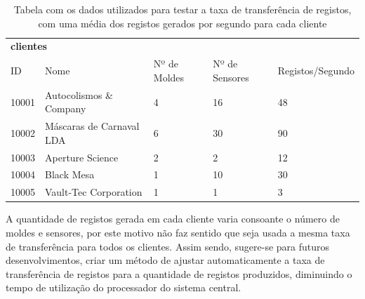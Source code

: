\documentclass[11pt,twoside,a4paper]{report}
\begin{document}
\begin{table}[H]
	\centering
	\begin{tabular}{|l|l|l|l|l|}
		\multicolumn{5}{l}{\textbf{clientes}}\\ \cline{1-5}
		ID & Nome & Nº de Moldes & Nº de Sensores & Registos/Segundo\\ \cline{1-5}
		10001 & Autocolismos \& Company & 4 & 16 & 48 \\ \cline{1-5}
		10002 & Máscaras de Carnaval LDA & 6 & 30 & 90 \\ \cline{1-5}
		10003 & Aperture Science & 2 & 2 & 12 \\ \cline{1-5}
		10004 & Black Mesa & 1 & 10 & 30 \\ \cline{1-5}
		10005 & Vault-Tec Corporation & 1 & 1 & 3 \\ \cline{1-5}
	\end{tabular}
	\caption[Tabela com os dados utilizados para testar a taxa de transferência de registos]{Tabela com os dados utilizados para testar a taxa de transferência de registos, com uma média dos registos gerados por segundo para cada cliente}
	\label{tab:conclusoes0}
\end{table}
A quantidade de registos gerada em cada cliente varia consoante o número de moldes e sensores, por este motivo não faz sentido que seja usada a mesma taxa de transferência para todos os clientes. Assim sendo, sugere-se para futuros desenvolvimentos, criar um método de ajustar automaticamente a taxa de transferência de registos para a quantidade de registos produzidos, diminuindo o tempo de utilização do processador do sistema central.
\end{document}
